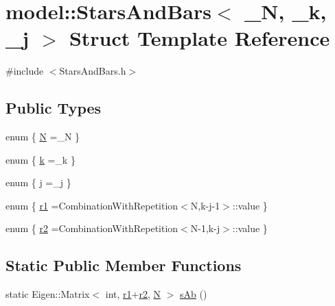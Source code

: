 \hypertarget{structmodel_1_1_stars_and_bars}{}\section{model\+:\+:Stars\+And\+Bars$<$ \+\_\+\+N, \+\_\+k, \+\_\+j $>$ Struct Template Reference}
\label{structmodel_1_1_stars_and_bars}


{\ttfamily \#include $<$Stars\+And\+Bars.\+h$>$}

\subsection*{Public Types}
\begin{DoxyCompactItemize}
\item 
enum \{ \hyperlink{structmodel_1_1_stars_and_bars_a2a987546802343245775bdb4d91bbd0fa98c06091f7588ff9fb4f708ef6d84f42}{N} =\+\_\+\+N
 \}
\item 
enum \{ \hyperlink{structmodel_1_1_stars_and_bars_ae68d99c56d94cd0b90bc5cfa0489ba46aa84d59d57c70444c63d167e590665f09}{k} =\+\_\+k
 \}
\item 
enum \{ \hyperlink{structmodel_1_1_stars_and_bars_a8418d00384f896579b43026a496402fdae5c8b98b91e348ced5a863cc3ccd4348}{j} =\+\_\+j
 \}
\item 
enum \{ \hyperlink{structmodel_1_1_stars_and_bars_ab96c0896f6bb7e359a1bb8c01531c2a7a70fae18196c3ceee67f636cf9a6a95a7}{r1} =Combination\+With\+Repetition$<$N,k-\/j-\/1$>$\+:\+:value
 \}
\item 
enum \{ \hyperlink{structmodel_1_1_stars_and_bars_a3f929089f103a6b4748be550ccb816d9aa4d2721dd6188139bb577db70a625d3f}{r2} =Combination\+With\+Repetition$<$N-\/1,k-\/j$>$\+:\+:value
 \}
\end{DoxyCompactItemize}
\subsection*{Static Public Member Functions}
\begin{DoxyCompactItemize}
\item 
static Eigen\+::\+Matrix$<$ int, \hyperlink{structmodel_1_1_stars_and_bars_ab96c0896f6bb7e359a1bb8c01531c2a7a70fae18196c3ceee67f636cf9a6a95a7}{r1}+\hyperlink{structmodel_1_1_stars_and_bars_a3f929089f103a6b4748be550ccb816d9aa4d2721dd6188139bb577db70a625d3f}{r2}, \hyperlink{structmodel_1_1_stars_and_bars_a2a987546802343245775bdb4d91bbd0fa98c06091f7588ff9fb4f708ef6d84f42}{N} $>$ \hyperlink{structmodel_1_1_stars_and_bars_af13113775747e633c265f1939b557203}{s\+Ab} ()
\end{DoxyCompactItemize}


